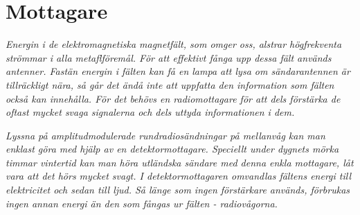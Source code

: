 \section{Mottagare}

\emph{Energin i de elektromagnetiska magnetfält, som omger oss,
  alstrar högfrekventa strömmar i alla metaflföremål. För att
  effektivt fånga upp dessa fält används antenner.  Fastän energin i
  fälten kan få en lampa att lysa om sändarantennen är tillräckligt
  nära, så går det ändå inte att uppfatta den information som fälten
  också kan innehålla.  För det behövs en radiomottagare för att dels
  förstärka de oftast mycket svaga signalerna och dels uttyda
  informationen i dem.}

\emph{Lyssna på amplitudmodulerade rundradiosändningar på mellanvåg
  kan man enklast göra med hjälp av en detektormottagare. Speciellt
  under dygnets mörka timmar vintertid kan man höra utländska sändare
  med denna enkla mottagare, låt vara att det hörs mycket svagt. I
  detektormottagaren omvandlas fältens energi till elektricitet och
  sedan till ljud. Så länge som ingen förstärkare används, förbrukas
  ingen annan energi än den som fångas ur fälten - radiovågorna.}

